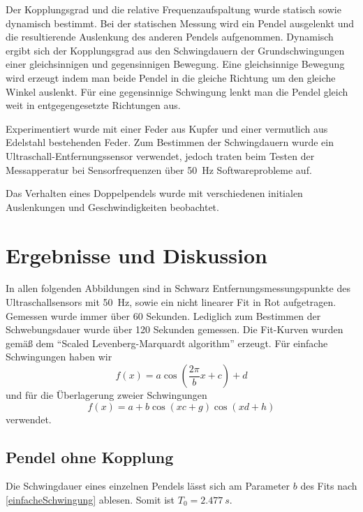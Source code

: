 \documentclass[
	a4paper,
	12pt,
	pagesize,
	ngerman
]{scrartcl}
\begin{document}
	Der Kopplungsgrad und die relative Frequenzaufspaltung wurde statisch sowie dynamisch bestimmt. Bei der statischen Messung wird ein Pendel ausgelenkt und die resultierende Auslenkung des anderen Pendels aufgenommen. Dynamisch ergibt sich der Kopplungsgrad aus den Schwingdauern der Grundschwingungen einer gleichsinnigen und gegensinnigen Bewegung. Eine gleichsinnige Bewegung wird erzeugt indem man beide Pendel in die gleiche Richtung um den gleiche Winkel auslenkt. Für eine gegensinnige Schwingung lenkt man die Pendel gleich weit in entgegengesetzte Richtungen aus.
	
	Experimentiert wurde mit einer Feder aus Kupfer und einer vermutlich aus Edelstahl bestehenden Feder.
	Zum Bestimmen der Schwingdauern wurde ein Ultraschall-Entfernungssensor verwendet, jedoch traten beim Testen der Messapperatur bei Sensorfrequenzen über \SI{50}{Hz} Softwareprobleme auf.

	Das Verhalten eines Doppelpendels wurde mit verschiedenen initialen Auslenkungen und Geschwindigkeiten beobachtet. 
	

	\section{Ergebnisse und Diskussion}
	In allen folgenden Abbildungen sind in Schwarz Entfernungsmessungspunkte des Ultraschallsensors mit \SI{50}{Hz}, sowie ein nicht linearer Fit in Rot aufgetragen. Gemessen wurde immer über \SI{60}{} Sekunden. Lediglich zum Bestimmen der Schwebungsdauer wurde über \SI{120}{} Sekunden gemessen. %
	Die Fit-Kurven wurden gemäß dem \enquote{Scaled Levenberg-Marquardt algorithm} erzeugt. 
	Für einfache Schwingungen haben wir
	\begin{equation}
		\label{einfacheSchwingung}
		f(x)=a \cos(\frac{2\pi}{b}x+c)+d
	\end{equation}
	und für die Überlagerung zweier Schwingungen
	\begin{equation}
		\label{überlagerteSchwingung}
		f(x)=a + b\cos(xc+g)\cos(xd+h)
	\end{equation}
	verwendet.
	\subsection{Pendel ohne Kopplung}
	Die Schwingdauer eines einzelnen Pendels lässt sich am Parameter $b$ des Fits nach \cref{einfacheSchwingung} ablesen. Somit ist $T_0 =  \SI{2,477}{s}$.
\end{document}
